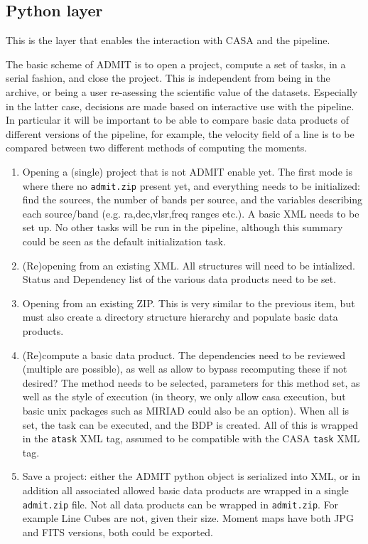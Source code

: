 \documentclass{article}
\begin{document}
\subsection{Python layer}

This is the layer that enables the interaction with
CASA and the pipeline. 

The basic scheme of ADMIT is to open a project, compute a set of
tasks, in a serial fashion, and close the project. This is independent
from being in the archive, or being a user re-asessing the scientific
value of the datasets. Especially in the latter case, decisions are
made based on interactive use with the pipeline. In particular it will
be important to be able to compare basic data products of different
versions of the pipeline, for example, the velocity field of a line is
to be compared between two different methods of computing the moments.

\begin{enumerate}

\item
Opening a (single) project that is not ADMIT enable yet.
The first mode is where there no {\tt admit.zip} 
present yet, and everything needs to be initialized: find
the sources, the number of bands per source, and the variables
describing each source/band (e.g. ra,dec,vlsr,freq ranges etc.). A
basic XML needs to be set up.  No other tasks will be run in the
pipeline, although this summary could be seen as the default
initialization task.


\item
(Re)opening from an existing XML.  All structures will need to be 
intialized. Status and Dependency list of the various data products
need to be set.

\item
Opening from an existing ZIP. This is very similar to the previous
item, but must also create a directory structure hierarchy and 
populate basic data products.

\item
(Re)compute a basic data product. The dependencies need to be reviewed
(multiple are possible), as well as allow to bypass recomputing these
if not desired?  The method needs to be selected, parameters for this
method set, as well as the style of execution (in theory, we only
allow casa execution, but basic unix packages such as MIRIAD could 
also be an option).  When all is set, the task can be executed, and the
BDP is created. All of this is wrapped in the {\tt atask} XML tag,
assumed to be compatible with the CASA {\tt task} XML tag.

\item
Save a project:  either the ADMIT python object is serialized into XML, 
or in addition all associated allowed basic data products 
are wrapped in a single {\tt admit.zip} file. Not all data products
can be wrapped in {\tt admit.zip}. For example Line Cubes are not, given
their size. Moment maps have both JPG and FITS versions, both could be
exported.

\end{enumerate}
\end{document}
